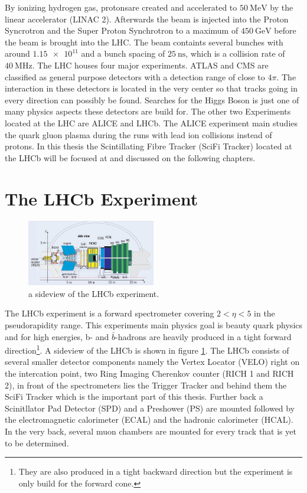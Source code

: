 By ionizing hydrogen gas, protonsare created and accelerated to $\SI{50}{\mega\electronvolt}$ by the linear accelerator (LINAC 2). Afterwards the beam is injected into the Proton Syncrotron and the Super Proton Synchrotron to a maximum of $\SI{450}{\giga\electronvolt}$ before the beam is brought into the LHC.
The beam containts several bunches with around $\num{1.15e11}$ and a bunch spacing of $\SI{25}{\nano\second}$, which is a collision rate of $\SI{40}{\mega\hertz}$.
The LHC houses four major experiments. ATLAS and CMS are classified as general purpose detectors with a detection range of close to $4\pi$. The interaction in these detectors is located in the very center so that tracks going in every direction can possibly be found. Searches for the Higgs Boson is just one of many physics aspects these detectors are build for.
The other two Experiments located at the LHC are ALICE and LHCb.
The ALICE experiment main studies the quark gluon plasma during the runs with lead ion collisions instead of protons.
In this thesis the Scintillating Fibre Tracker (SciFi Tracker) located at the LHCb will be focused at and discussed on the following chapters.

\section{The LHCb Experiment\cite{lhcbInfo}}

\begin{figure}
  \centering
  \includegraphics[width=0.5\textwidth]{plots/LHCb_facility.jpg}
  \caption{a sideview of the LHCb experiment.}
  \label{fig:LHCb}
\end{figure}

The LHCb experiment is a forward spectrometer covering $2 \less \eta \less 5$ in the pseudorapidity range. This experiments main physics goal is beauty quark physics and for high energies, b- and $\bar{b}$-hadrons are heavily produced in a tight forward direction\footnote{They are also produced in a tight backward direction but the experiment is only build for the forward cone.}. A sideview of the LHCb is shown in figure \ref{fig:LHCb}.
The LHCb consists of several smaller detector components namely the Vertex Locator (VELO) right on the intercation point, two Ring Imaging Cherenkov counter (RICH 1 and RICH 2), in front of the spectrometers lies the Trigger Tracker and behind them the SciFi Tracker which is the important part of this thesis. Further back a Scinitllator Pad Detector (SPD) and a Preshower (PS) are mounted followed by the electromagnetic calorimeter (ECAL) and the hadronic calorimeter (HCAL). In the very back, several muon chambers are mounted for every track that is yet to be determined.

